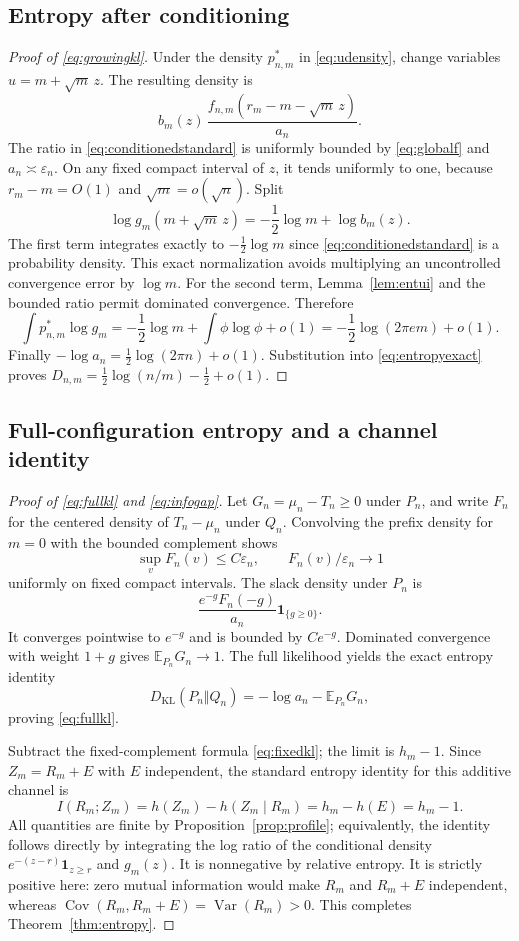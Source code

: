 \documentclass[11pt,a4paper]{article}
\numberwithin{equation}{section}
\theoremstyle{definition}
\theoremstyle{remark}
\newcommand{\E}{\mathbb E}
\newcommand{\Var}{\operatorname{Var}}
\newcommand{\Cov}{\operatorname{Cov}}
\newcommand{\KL}{D_{\mathrm{KL}}}
\newcommand{\ind}{\mathbf 1}
\newcommand{\eps}{\varepsilon}
\begin{document}
\subsection{Entropy after conditioning}
\begin{proof}[Proof of \eqref{eq:growingkl}]
Under the density $p^*_{n,m}$ in \eqref{eq:udensity}, change variables
$u=m+\sqrt m\,z$. The resulting density is
\begin{equation}\label{eq:conditionedstandard}
b_m(z)\,\frac{f_{n,m}(r_m-m-\sqrt m\,z)}{a_n}.
\end{equation}
The ratio in \eqref{eq:conditionedstandard} is uniformly bounded by
\eqref{eq:globalf} and $a_n\asymp\eps_n$. On any fixed compact interval
of $z$, it tends uniformly to one, because $r_m-m=O(1)$ and
$\sqrt m=o(\sqrt n)$. Split
\[
\log g_m(m+\sqrt m\,z)=-\frac12\log m+\log b_m(z).
\]
The first term integrates exactly to $-\tfrac12\log m$ since
\eqref{eq:conditionedstandard} is a probability density. This exact
normalization avoids multiplying an uncontrolled convergence error by
$\log m$. For the second term, Lemma~\ref{lem:entui} and the bounded
ratio permit dominated convergence. Therefore
\[
\int p^*_{n,m}\log g_m
 =-\frac12\log m+\int\phi\log\phi+o(1)
 =-\frac12\log(2\pi e m)+o(1).
\]
Finally $-\log a_n=\tfrac12\log(2\pi n)+o(1)$.
Substitution into \eqref{eq:entropyexact} proves
$D_{n,m}=\tfrac12\log(n/m)-\tfrac12+o(1)$.
\end{proof}

\subsection{Full-configuration entropy and a channel identity}
\begin{proof}[Proof of \eqref{eq:fullkl} and \eqref{eq:infogap}]
Let $G_n=\mu_n-T_n\ge0$ under $P_n$, and write $F_n$ for the centered
density of $T_n-\mu_n$ under $Q_n$. Convolving the prefix density for
$m=0$ with the bounded complement shows
\[
\sup_vF_n(v)\le C\eps_n,\qquad
F_n(v)/\eps_n\longrightarrow1
\]
uniformly on fixed compact intervals. The slack density under $P_n$ is
\[
\frac{e^{-g}F_n(-g)}{a_n}\ind_{\{g\ge0\}}.
\]
It converges pointwise to $e^{-g}$ and is bounded by $Ce^{-g}$.
Dominated convergence with weight $1+g$ gives $\E_{P_n}G_n\to1$.
The full likelihood yields the exact entropy identity
\[
\KL(P_n\Vert Q_n)=-\log a_n-\E_{P_n}G_n,
\]
proving \eqref{eq:fullkl}.

Subtract the fixed-complement formula \eqref{eq:fixedkl}; the limit is
$h_m-1$. Since $Z_m=R_m+E$ with $E$ independent, the standard entropy
identity for this additive channel is
\[
I(R_m;Z_m)=h(Z_m)-h(Z_m\mid R_m)=h_m-h(E)=h_m-1.
\]
All quantities are finite by Proposition~\ref{prop:profile}; equivalently,
the identity follows directly by integrating the log ratio of the
conditional density $e^{-(z-r)}\ind_{z\ge r}$ and $g_m(z)$.
It is nonnegative by relative entropy. It is strictly positive here:
zero mutual information would make $R_m$ and $R_m+E$ independent, whereas
$\Cov(R_m,R_m+E)=\Var(R_m)>0$. This completes
Theorem~\ref{thm:entropy}.
\end{proof}
\end{document}

